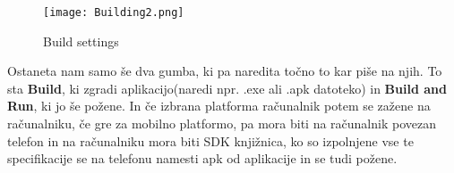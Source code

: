 \begin{figure}[ht!]
	\centering
	\texttt{[image: Building2.png]}
	\caption{Build settings}
\end{figure}
Ostaneta nam samo še dva gumba, ki pa naredita točno to kar piše na njih. To sta \textbf{Build}, ki zgradi aplikacijo(naredi npr. .exe ali .apk datoteko) in \textbf{Build and Run}, ki jo še požene. In če izbrana platforma računalnik potem se zažene na računalniku, če gre za mobilno platformo, pa mora biti na računalnik povezan telefon in na računalniku mora biti SDK knjižnica, ko so izpolnjene vse te specifikacije se na telefonu namesti apk od aplikacije in se tudi požene.